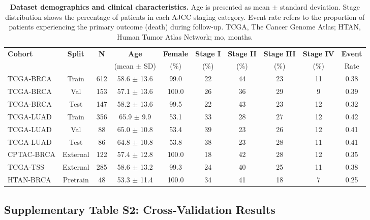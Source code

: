 \documentclass[11pt,a4paper]{article}
\begin{document}
\begin{table}[H]
\centering
\small
\caption{\textbf{Dataset demographics and clinical characteristics.} Age is presented as mean $\pm$ standard deviation. Stage distribution shows the percentage of patients in each AJCC staging category. Event rate refers to the proportion of patients experiencing the primary outcome (death) during follow-up. TCGA, The Cancer Genome Atlas; HTAN, Human Tumor Atlas Network; mo, months.}
\label{tab:s1_demographics}
\begin{tabular}{@{}lccccccccc@{}}
\toprule
\textbf{Cohort} & \textbf{Split} & \textbf{N} & \textbf{Age} & \textbf{Female} & \textbf{Stage I} & \textbf{Stage II} & \textbf{Stage III} & \textbf{Stage IV} & \textbf{Event} \\
 & & & (mean $\pm$ SD) & (\%) & (\%) & (\%) & (\%) & (\%) & Rate \\
\midrule
TCGA-BRCA & Train & 612 & 58.6 $\pm$ 13.6 & 99.0 & 22 & 44 & 23 & 11 & 0.38 \\
TCGA-BRCA & Val & 153 & 57.1 $\pm$ 13.6 & 100.0 & 26 & 36 & 29 & 9 & 0.39 \\
TCGA-BRCA & Test & 147 & 58.2 $\pm$ 13.6 & 99.5 & 22 & 43 & 23 & 12 & 0.32 \\
\addlinespace[0.5ex]
TCGA-LUAD & Train & 356 & 65.9 $\pm$ 9.9 & 53.1 & 33 & 28 & 27 & 12 & 0.42 \\
TCGA-LUAD & Val & 88 & 65.0 $\pm$ 10.8 & 53.4 & 39 & 23 & 26 & 12 & 0.41 \\
TCGA-LUAD & Test & 86 & 64.8 $\pm$ 10.8 & 53.8 & 38 & 23 & 28 & 11 & 0.41 \\
\addlinespace[0.5ex]
CPTAC-BRCA & External & 122 & 57.4 $\pm$ 12.8 & 100.0 & 18 & 42 & 28 & 12 & 0.35 \\
\addlinespace[0.5ex]
TCGA-TSS & External & 285 & 58.6 $\pm$ 13.2 & 99.3 & 24 & 40 & 25 & 11 & 0.38 \\
\addlinespace[0.5ex]
HTAN-BRCA & Pretrain & 48 & 53.3 $\pm$ 11.4 & 100.0 & 34 & 41 & 18 & 7 & 0.25 \\
\bottomrule
\end{tabular}
\end{table}

\newpage

\subsection{Supplementary Table S2: Cross-Validation Results}
\end{document}
